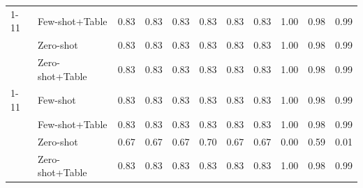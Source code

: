 \begin{table}[htbp]
\begin{tabular}{@{}llccccccccc@{}}
\cmidrule(lr){1-11}
\multirow{3}{*}{Mistral-Large} & Few-shot+Table & 0.83 & 0.83 & 0.83 & 0.83 & 0.83 & 0.83 & 1.00 & 0.98 & 0.99 \\
 & Zero-shot & 0.83 & 0.83 & 0.83 & 0.83 & 0.83 & 0.83 & 1.00 & 0.98 & 0.99 \\
 & Zero-shot+Table & 0.83 & 0.83 & 0.83 & 0.83 & 0.83 & 0.83 & 1.00 & 0.98 & 0.99 \\
\cmidrule(lr){1-11}
\multirow{4}{*}{Mistral-Small} & Few-shot & 0.83 & 0.83 & 0.83 & 0.83 & 0.83 & 0.83 & 1.00 & 0.98 & 0.99 \\
 & Few-shot+Table & 0.83 & 0.83 & 0.83 & 0.83 & 0.83 & 0.83 & 1.00 & 0.98 & 0.99 \\
 & Zero-shot & 0.67 & 0.67 & 0.67 & 0.70 & 0.67 & 0.67 & 0.00 & 0.59 & 0.01 \\
 & Zero-shot+Table & 0.83 & 0.83 & 0.83 & 0.83 & 0.83 & 0.83 & 1.00 & 0.98 & 0.99 \\
\bottomrule
\end{tabular}
\end{table}